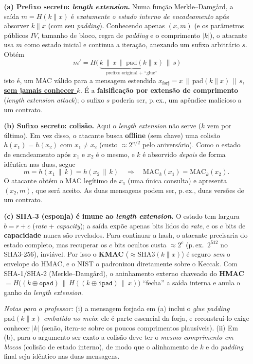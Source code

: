 \documentclass[11pt,a4paper]{article}
\newcommand{\alert}[1]{\textbf{\uline{#1}}}
\newenvironment{resposta}{%
    \begin{respostabox}
    \color{red!70!black}\sloppy
}{%
    \end{respostabox}
}
\begin{document}
\begin{resposta}
\textbf{(a) Prefixo secreto: \textit{length extension}.} Numa fun\c{c}\~{a}o Merkle--Damg\r{a}rd, a sa\'{i}da $m = H(k\|x)$ \'{e} \emph{exatamente o estado interno de encadeamento} ap\'{o}s absorver $k\|x$ (com seu \textit{padding}). Conhecendo apenas $(x, m)$ (e os par\^{a}metros p\'{u}blicos $IV$, tamanho de bloco, regra de \textit{padding} e o comprimento $|k|$), o atacante usa $m$ como estado inicial e continua a itera\c{c}\~{a}o, anexando um sufixo arbitr\'{a}rio $s$. Obt\'{e}m
\[
    m' = H\big(\, \underbrace{k \,\|\, x \,\|\, \text{pad}(k\|x)}_{\text{prefixo original + ``glue''}} \,\|\, s \,\big)
\]
isto \'{e}, um MAC v\'{a}lido para a mensagem estendida $x_{\text{forj}} = x \,\|\, \text{pad}(k\|x) \,\|\, s$, \alert{sem jamais conhecer $k$}. \'{E} a \textbf{falsifica\c{c}\~{a}o por extens\~{a}o de comprimento} (\textit{length extension attack}); o sufixo $s$ poderia ser, p.\,ex., um ap\^{e}ndice malicioso a um contrato.

\textbf{(b) Sufixo secreto: colis\~{a}o.} Aqui o \textit{length extension} n\~{a}o serve ($k$ vem por \'{u}ltimo). Em vez disso, o atacante busca \textbf{offline} (sem chave) uma colis\~{a}o $h(x_1) = h(x_2)$ com $x_1 \neq x_2$ (custo $\approx 2^{n/2}$ pelo anivers\'{a}rio). Como o estado de encadeamento ap\'{o}s $x_1$ e $x_2$ \'{e} o mesmo, e $k$ \'{e} absorvido \emph{depois} de forma id\^{e}ntica nas duas, segue
\[
    m = h(x_1 \,\|\, k) = h(x_2 \,\|\, k) \quad\Rightarrow\quad \text{MAC}_k(x_1) = \text{MAC}_k(x_2).
\]
O atacante obt\'{e}m o MAC leg\'{i}timo de $x_1$ (uma \'{u}nica consulta) e apresenta $(x_2, m)$, que ser\'{a} aceito. As duas mensagens podem ser, p.\,ex., duas vers\~{o}es de um contrato.

\textbf{(c) SHA-3 (esponja) \'{e} imune ao \textit{length extension}.} O estado tem largura $b = r + c$ (\textit{rate} + \textit{capacity}); a sa\'{i}da exp\~{o}e apenas bits lidos do \textit{rate}, e os $c$ bits de \textbf{capacidade} nunca s\~{a}o revelados. Para continuar a hash, o atacante precisaria do estado completo, mas recuperar os $c$ bits ocultos custa $\approx 2^{c}$ (p.\,ex.\ $2^{512}$ no SHA3-256), invi\'{a}vel. Por isso o \textbf{KMAC} ($\approx \text{SHA3}(k\|x)$) \'{e} seguro \emph{sem} o envelope do HMAC, e o NIST o padronizou diretamente sobre o Keccak. Com SHA-1/SHA-2 (Merkle--Damg\r{a}rd), o aninhamento externo chaveado do \textbf{HMAC} $= H\big((k\oplus\texttt{opad}) \,\|\, H((k\oplus\texttt{ipad})\,\|\,x)\big)$ ``fecha'' a sa\'{i}da interna e anula o ganho do \textit{length extension}.

{\footnotesize\textit{Notas para o professor:} (i) a mensagem forjada em (a) inclui o \emph{glue padding} $\text{pad}(k\|x)$ \emph{embutido no meio}: ele \'{e} parte essencial da forja, e reconstru\'{i}-lo exige conhecer $|k|$ (sen\~{a}o, itera-se sobre os poucos comprimentos plaus\'{i}veis). (ii) Em (b), para o argumento ser exato a colis\~{a}o deve ter o \emph{mesmo comprimento em blocos} (colis\~{a}o de estado interno), de modo que o alinhamento de $k$ e do \textit{padding} final seja id\^{e}ntico nas duas mensagens.}
\end{resposta}
\end{document}
